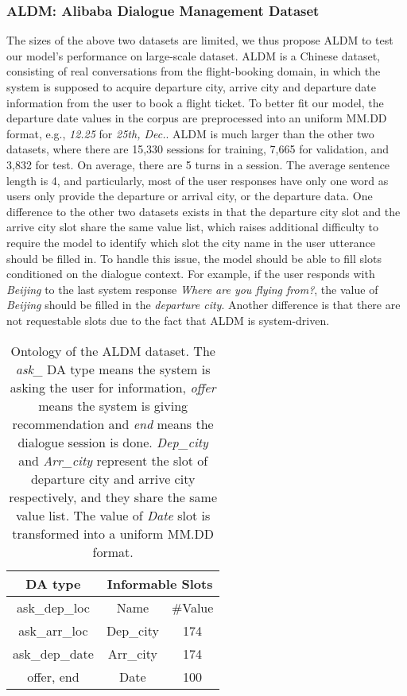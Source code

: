 \subsubsection{ALDM: Alibaba Dialogue Management Dataset}
\label{sec:aldm-dataset}
The sizes of the above two datasets are limited, we thus propose ALDM to test our model's performance on large-scale dataset.
ALDM is a Chinese dataset, consisting of real conversations from the flight-booking domain, in which the system is supposed to acquire departure city, arrive city and departure date information from the user to book a flight ticket. To better fit our model, the departure date values in the corpus are preprocessed into an uniform MM.DD format, e.g., {\em 12.25} for {\em 25th, Dec.}. ALDM is much larger than the other two datasets, where there are 15,330 sessions for training, 7,665 for validation, and 3,832 for test. 
On average, there are 5 turns in a session. The average sentence length is 4, and particularly, most of the user responses have only one word as users only provide the departure or arrival city, or the departure data.
One difference to the other two datasets exists in that the departure city slot and the arrive city slot share the same value list, which raises additional difficulty to require the model to identify which slot the city name in the user utterance should be filled in. To handle this issue, the model should be able to fill slots conditioned on the dialogue context. For example, if the user responds with {\em Beijing} to the last system response {\em Where are you flying from?}, the value of {\em Beijing} should be filled in the {\em departure city}. Another difference is that there are not requestable slots due to the fact that ALDM is system-driven.


\begin{table}[htbp]
\begin{center}
\begin{tabular}{| c | c | c |}
  \hline
    {\bf DA type} & \multicolumn{2}{c|}{\bf Informable Slots}\\
  \hline
    ask\_dep\_loc & Name & \#Value\\
  \cline{2-3}
    ask\_arr\_loc & Dep\_city & 174 \\
    ask\_dep\_date & Arr\_city & 174 \\
    offer, end & Date & 100 \\
  \hline
\end{tabular}
\caption{\label{tab:aldm-ontology}Ontology of the ALDM dataset. The {\em ask\_} DA type means the system is asking the user for information, {\em offer} means the system is giving recommendation and {\em end} means the dialogue session is done. {\em Dep\_city} and {\em Arr\_city} represent the slot of departure city and arrive city respectively, and they share the same value list. The value of {\em Date} slot is transformed into a uniform MM.DD format.}
\end{center}
\end{table}

